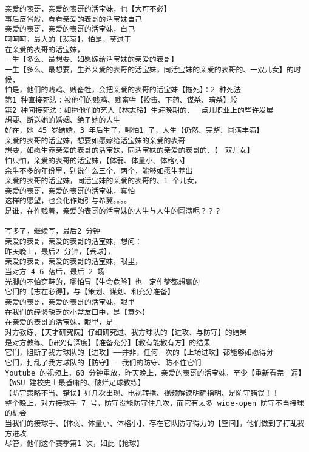\documentclass[9pt, b5paper]{article}
\begin{document}
\begin{verbatim}
亲爱的表哥，亲爱的表哥的活宝妹，也【大可不必】
事后反省般，看看亲爱的表哥的活宝妹自己 
亲爱的表哥，亲爱的表哥的活宝妹，自己 
呵呵呵，最大的【悲哀】，怕是，莫过于
在亲爱的表哥的活宝妹，
一生【多么、最想要、如愿嫁给活宝妹的亲爱的表哥】
一生【多么、最想要，生养亲爱的表哥的活宝妹，同活宝妹的亲爱的表哥的、一双儿女】的时候，
怕是，他们的贱鸡、贱畜牲，会把亲爱的表哥的活宝妹【拖死】：2 种死法
第1 种直接死法：被他们的贱鸡、贱畜牲【投毒、下药、谋杀、暗杀】般
第2 种间接死法：如拖他们的艺人【林志玲】生漄晚期的、一点儿职业上的些许发展 
想要、断送她的婚姻、绝子她的人生
好在，她 45 岁结婚，3 年后生子，哪怕1 子，人生【仍然、完整、圆满丰满】
亲爱的表哥的活宝妹，想要如愿嫁给活宝妹的亲爱的表哥 
想要，如愿生养亲爱的表哥的活宝妹，同活宝妹的亲爱的表哥的、【一双儿女】
怕只怕，亲爱的表哥的活宝妹，【体弱、体量小、体格小】
余生不多的年份里，别说什么三个、两个，能够如愿生养出
亲爱的表哥的活宝妹，同活宝妹的亲爱的表哥的、1 个儿女，
亲爱的表哥，亲爱的表哥的活宝妹，真怕 
这样的愿望，也会化作炮引与希翼。。。。
是谁，在作贱着，亲爱的表哥的活宝妹的人生与人生的圆满呢？？？

写多了，继续写，最后2 分钟
亲爱的表哥，亲爱的表哥的活宝妹，想问：
昨天晚上，最后2 分钟，【丢球】，
亲爱的表哥，亲爱的表哥的活宝妹，眼里，
当对方 4-6 落后，最后 2 场
光脚的不怕穿鞋的，哪怕冒【生命危险】也一定作梦都想赢的
它们的【志在必得】，与【策划、谋划、和充分准备】
亲爱的表哥，亲爱的表哥的活宝妹，眼里
在我们的经验缺乏的小盆友口中，是【意外】
在亲爱的表哥的活宝妹，眼里，是
对方教练、【天才研究院】仔细研究过、我方球队的【进攻、与防守】的结果
是对方教练、【研究有深度】【准备充分】【教有能教有方】的结果
它们，阻断了我方球队的【进攻】——并非，任何一次的【上场进攻】都能够如愿得分
它们，打乱了我方球队的【防守】——我们的防守、防不住它们
Youtube 的视频上，60 分钟重放，昨天晚上，亲爱的表哥的活宝妹，至少【重新看完一遍】
【WSU 建校史上最昏庸的、破烂足球教练】
【防守策略不当、错误】好几次出现、电视转播、视频解读明确指明、是防守错误！！
整个晚上，对方接球手 7 号，防守没能防守住几次，而它有太多 wide-open 防守不当接球的机会
当我们的接球手、【体弱、体量小、体格小】、存在它队防守得力的【空间】，他们做到了打乱我方进攻
尽管，他们这个赛季第1 次，如此【抢球】


\end{verbatim}
\end{document}
